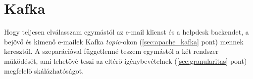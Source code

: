 \section{Kafka}
Hogy teljesen elválasszam egymástól az e-mail klienst és a helpdesk backendet, a bejövő és kimenő e-mailek Kafka \textit{topic}-okon (\ref{sec:apache_kafka} pont) mennek keresztül. A szeparációval függetlenné teszem egymástól a két rendszer működését, ami lehetővé teszi az eltérő igénybevételnek (\ref{sec:granularitas} pont) megfelelő skálázhatóságot.
